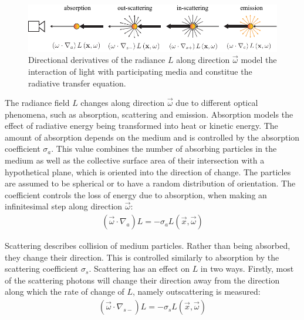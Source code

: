 \begin{figure}[h]
\centering
\includegraphics[width=1.0\textwidth]{03_foundations_of_light_transport_simulation/figures/fig_rte_terms.pdf}
\caption{Directional derivatives of the radiance $L$ along direction $\vec{\omega}$ model the interaction of light with participating media and constitue the radiative transfer equation.}
\label{fig:rte_change_L_all}
\end{figure}

The radiance field $L$ changes along direction $\vec{\omega}$ due to different optical phenomena, such as absorption, scattering and emission. Absorption models the effect of radiative energy being transformed into heat or kinetic energy. The amount of absorption depends on the medium and is controlled by the absorption coefficient $\sigma_a$. This value combines the number of absorbing particles in the medium as well as the collective surface area of their intersection with a hypothetical plane, which is oriented into the direction of change. The particles are assumed to be spherical or to have a random distribution of orientation. The coefficient controls the loss of energy due to absorption, when making an infinitesimal step along direction $\vec{\omega}$:
\begin{align}
\left(\vec{\omega}\cdot\nabla_{a}\right)L = -\sigma_a L\left(\vec{x}, \vec{\omega} \right)
\end{align}

Scattering describes collision of medium particles. Rather than being absorbed, they change their direction. This is controlled similarly to absorption by the scattering coefficient $\sigma_s$. Scattering has an effect on $L$ in two ways. Firstly, most of the scattering photons will change their direction away from the direction along which the rate of change of $L$, namely outscattering is measured:
\begin{align}
\left(\vec{\omega}\cdot\nabla_{s-}\right)L = -\sigma_s L\left(\vec{x}, \vec{\omega} \right)
\end{align}

